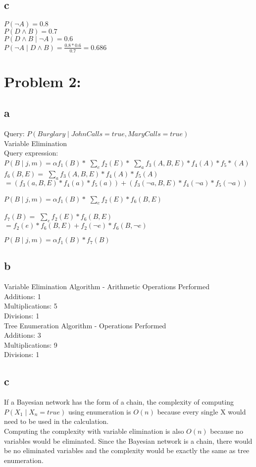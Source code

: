 \documentclass[11pt, oneside]{article}   	%
\begin{document}
\begin{flushleft}
\subsection*{c}
$P(\neg A)=0.8$\\
$P(D \wedge B)=0.7$\\
$P(D \wedge B \mid \neg A)=0.6$\\
$P(\neg A \mid D \wedge B)=\frac{0.8*0.6}{0.7}=0.686$\\\medskip
\section*{Problem 2:}
\subsection*{a}
Query: $P(Burglary \mid JohnCalls = true, MaryCalls = true)$\\
Variable Elimination\\
Query expression:\\
$P(B \mid j,m) = \alpha f_1 (B) * $
$\sum_{e}
f_2 (E) * $
$\sum_{a}
f_3 (A, B, E) * f_4 (A) * f_5 * (A)$\\

$f_6 (B,E)=$
$\sum_{a}
f_3 (A,B,E)*f_4 (A)*f_5 (A)$\\
$=(f_3 (a, B, E)* f_4 (a)* f_5 (a)) + (f_3 (\neg a, B, E)* f_4 (\neg a)* f_5 (\neg a))$

$P(B \mid j,m)= \alpha f_1 (B)*$
$\sum_{e}
f_2 (E) * f_6 (B,E)$

$f_7 (B)=$
$\sum_{e}
f_2 (E) * f_6 (B,E)$\\
$=f_2 (e) *f_6 (B,E)+f_2 (\neg e) * f_6 (B, \neg e)$

$P(B \mid j,m)= \alpha f_1 (B) * f_7 (B)$

\subsection*{b}
Variable Elimination Algorithm - Arithmetic Operations Performed\\
Additions: 1\\
Multiplications: 5\\
Divisions: 1\\
Tree Enumeration Algorithm - Operations Performed\\
Additions: 3\\
Multiplications: 9\\
Divisions: 1\\
\subsection*{c}
If a Bayesian network has the form of a chain, the complexity of computing $P(X_1 \mid X_n = true)$ using enumeration is $O(n)$ because every single X would need to be used in the calculation.\\
Computing the complexity with variable elimination is also $O(n)$ because no variables would be eliminated. Since the Bayesian network is a chain, there would be no eliminated variables and the complexity would be exactly the same as tree enumeration.\\

\end{flushleft}
\end{document}
